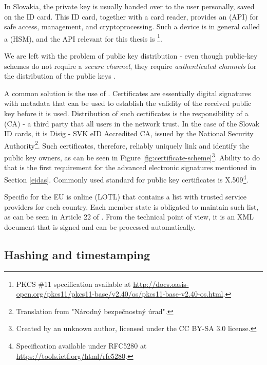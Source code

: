 \documentclass[thesismargins, english, thesislinespacing, onelinechapterstyle, upjsfrontpage]{rnthesis}
\begin{document}
In Slovakia, the private key is usually handed over to the user personally, saved on the ID card. This ID card, together with a card reader, provides an  (API) for safe access, management, and cryptoprocessing.
Such a device is in general called a  (HSM), and the API relevant for this thesis is  \footnote{PKCS \#11 specification available at \url{http://docs.oasis-open.org/pkcs11/pkcs11-base/v2.40/os/pkcs11-base-v2.40-os.html}.}.

We are left with the problem of public key distribution - even though public-key schemes do not require a \textit{secure channel}, they require \textit{authenticated channels} for the distribution of the public keys \cite{cryptotxtbook}.

A common solution is the use of .
Certificates are essentially digital signatures with metadata that can be used to establish the validity of the received public key before it is used.
Distribution of such certificates is the responsibility of a  (CA) - a third party that all users in the network trust.
In the case of the Slovak ID cards, it is Disig - SVK eID Accredited CA, issued by the National Security Authority\footnote{Translation from "Národný bezpečnostný úrad".}.
Such certificates, therefore, reliably uniquely link and identify the public key owners, as can be seen in Figure \ref{fig:certificate-scheme}\footnote{Created by an unknown author, licensed under the CC BY-SA 3.0 license.}.
Ability to do that is the first requirement for the advanced electronic signatures mentioned in Section \ref{eidas}.
Commonly used standard for public key certificates is X.509\footnote{Specification available under RFC5280 at \url{https://tools.ietf.org/html/rfc5280}.}.


Specific for the EU is online  (LOTL) that contains a list with trusted service providers for each country.
Each member state is obligated to maintain such list, as can be seen in Article 22 of \cite{eidas}.
From the technical point of view, it is an XML document that is signed and can be processed automatically.

\subsection{Hashing and timestamping}
\end{document}
